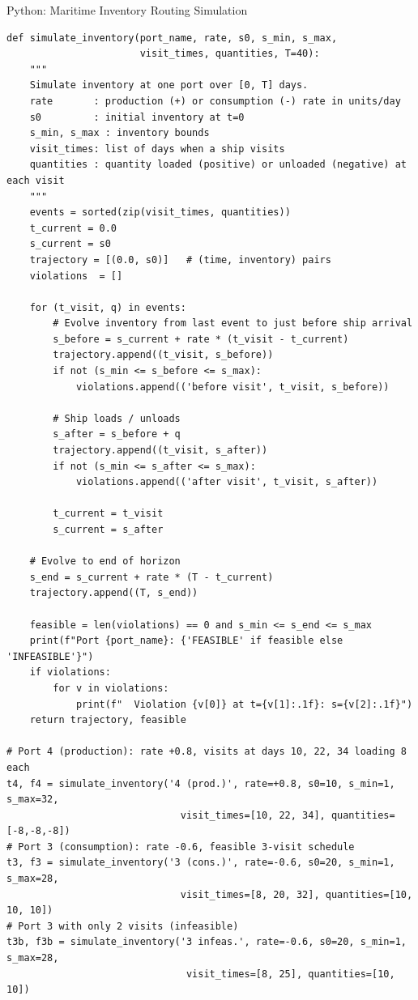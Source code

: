 \documentclass[aspectratio=169,10pt]{beamer}
\begin{document}
\begin{frame}[fragile]{Python: Maritime Inventory Routing Simulation}
\begin{lstlisting}[caption={Simulation of port inventory levels under a given MIR schedule.
                             Implements the inventory balance (constraints 13.52--13.53).}]
def simulate_inventory(port_name, rate, s0, s_min, s_max,
                       visit_times, quantities, T=40):
    """
    Simulate inventory at one port over [0, T] days.
    rate       : production (+) or consumption (-) rate in units/day
    s0         : initial inventory at t=0
    s_min, s_max : inventory bounds
    visit_times: list of days when a ship visits
    quantities : quantity loaded (positive) or unloaded (negative) at each visit
    """
    events = sorted(zip(visit_times, quantities))
    t_current = 0.0
    s_current = s0
    trajectory = [(0.0, s0)]   # (time, inventory) pairs
    violations  = []

    for (t_visit, q) in events:
        # Evolve inventory from last event to just before ship arrival
        s_before = s_current + rate * (t_visit - t_current)
        trajectory.append((t_visit, s_before))
        if not (s_min <= s_before <= s_max):
            violations.append(('before visit', t_visit, s_before))

        # Ship loads / unloads
        s_after = s_before + q
        trajectory.append((t_visit, s_after))
        if not (s_min <= s_after <= s_max):
            violations.append(('after visit', t_visit, s_after))

        t_current = t_visit
        s_current = s_after

    # Evolve to end of horizon
    s_end = s_current + rate * (T - t_current)
    trajectory.append((T, s_end))

    feasible = len(violations) == 0 and s_min <= s_end <= s_max
    print(f"Port {port_name}: {'FEASIBLE' if feasible else 'INFEASIBLE'}")
    if violations:
        for v in violations:
            print(f"  Violation {v[0]} at t={v[1]:.1f}: s={v[2]:.1f}")
    return trajectory, feasible

# Port 4 (production): rate +0.8, visits at days 10, 22, 34 loading 8 each
t4, f4 = simulate_inventory('4 (prod.)', rate=+0.8, s0=10, s_min=1, s_max=32,
                              visit_times=[10, 22, 34], quantities=[-8,-8,-8])
# Port 3 (consumption): rate -0.6, feasible 3-visit schedule
t3, f3 = simulate_inventory('3 (cons.)', rate=-0.6, s0=20, s_min=1, s_max=28,
                              visit_times=[8, 20, 32], quantities=[10, 10, 10])
# Port 3 with only 2 visits (infeasible)
t3b, f3b = simulate_inventory('3 infeas.', rate=-0.6, s0=20, s_min=1, s_max=28,
                               visit_times=[8, 25], quantities=[10, 10])
\end{lstlisting}
\end{frame}
\end{document}
